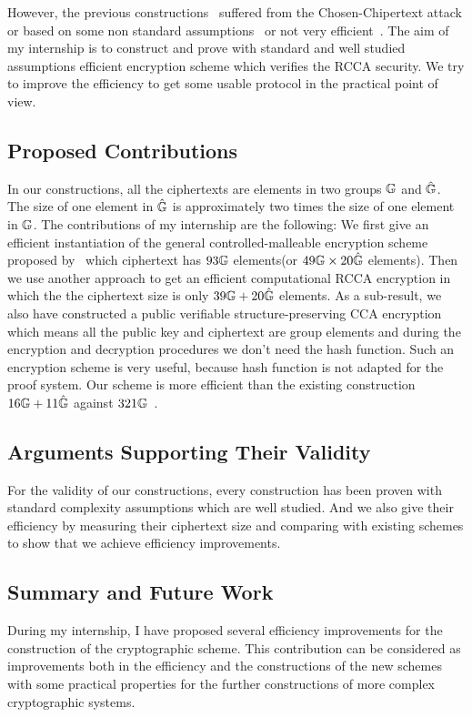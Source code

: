 However, the previous constructions~\cite{DBLP:conf/ctrsa/GolleJJS04} suffered from the Chosen-Chipertext attack or based on some non standard assumptions~\cite{DBLP:conf/crypto/PrabhakaranR07} or not very efficient~\cite{DBLP:conf/eurocrypt/ChaseKLM12}.
The aim of my internship is to construct and prove with standard and well studied assumptions efficient encryption scheme which verifies the RCCA security.
We try to improve the efficiency to get some usable protocol in the practical point of view.

\subsection*{Proposed Contributions}
In our constructions, all the ciphertexts are elements in two groups $\mathbb{G}$ and $\hat{\mathbb{G}}$.
The size of one element in $\hat{\mathbb{G}}$ is approximately two times the size of one element in $\mathbb{G}$.
The contributions of my internship are the following:
We first give an efficient instantiation of the general controlled-malleable encryption scheme proposed by~\cite{DBLP:conf/eurocrypt/ChaseKLM12} which ciphertext has $93\mathbb{G}$ elements(or $49\mathbb{G} \times 20\hat{\mathbb{G}}$ elements).
Then we use another approach to get an efficient computational RCCA encryption in which the the ciphertext size is only $39\mathbb{G} + 20 \hat{\mathbb{G}}$ elements.
As a sub-result, we also have constructed a public verifiable structure-preserving CCA encryption which means all the public key and ciphertext are group elements and during the encryption and decryption procedures we don't need the hash function.
Such an encryption scheme is very useful, because hash function is not adapted for the proof system.
Our scheme is more efficient than the existing construction $16\mathbb{G} + 11\hat{\mathbb{G}}$ against $321\mathbb{G}$~\cite{DBLP:conf/pkc/AbeDKNO13}.

\subsection*{Arguments Supporting Their Validity}
For the validity of our constructions,
every construction has been proven with standard complexity assumptions which are well studied.
And we also give their efficiency by measuring their ciphertext size and comparing with existing schemes to show that we achieve efficiency improvements.

\subsection*{Summary and Future Work}
During my internship, I have proposed several efficiency improvements for the construction of the cryptographic scheme.
This contribution can be considered as improvements both in the efficiency and the constructions of the new schemes with some practical properties for the further constructions of more complex cryptographic systems.

